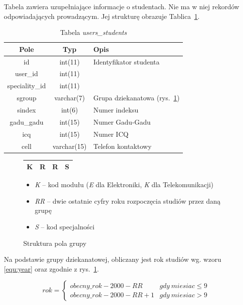 \documentclass[a4paper,12pt,oneside]{report}
\begin{document}
Tabela zawiera uzupełniające informacje o studentach. Nie ma w niej rekordów odpowiadających prowadzącym. Jej strukturę obrazuje Tablica~\ref{tab:users_students}.
\begin{table}[h]
  \centering
  \begin{tabular}{|c|c|l|}\hline
  Pole & Typ & Opis \\\hline
  id             & int(11)     & Identyfikator studenta \\
  user\_id       & int(11)     & \\
  speciality\_id & int(11)     & \\
  sgroup         & varchar(7)  & Grupa dziekanatowa (rys.~\ref{fig:group})\\
  sindex         & int(6)      & Numer indeksu \\
  gadu\_gadu     & int(15)     & Numer Gadu-Gadu \\
  icq            & int(15)     & Numer ICQ \\
  cell           & varchar(15) & Telefon kontaktowy \\\hline

  \end{tabular}
  \caption{Tabela \emph{users\_students}\label{tab:users_students}}
\end{table}

\begin{figure}[h]
  \centering
  \begin{tabular}{|c|c|c|c|}\hline
  K & R & R & S\\\hline
  \end{tabular}
  \begin{itemize}
    \item \emph{K} -- kod modułu (\emph{E} dla Elektroniki, \emph{K} dla Telekomunikacji)
    \item \emph{RR} -- dwie ostatnie cyfry roku rozpoczęcia studiów przez daną grupę
    \item \emph{S} -- kod specjalności
  \end{itemize}
  \caption{Struktura pola grupy\label{fig:group}}
\end{figure}

Na podstawie grupy dziekanatowej, obliczany jest rok studiów wg. wzoru \ref{equ:year} oraz zgodnie z rys.~\ref{fig:group}.

\begin{equation}
  rok = \left\{ \begin{array}{ll}
  obecny\_rok - 2000 - RR & gdy~miesiac \le 9\\
  obecny\_rok - 2000 - RR + 1 & gdy~miesiac > 9
  \end{array} \right.
  \label{equ:year}
\end{equation}
\end{document}
